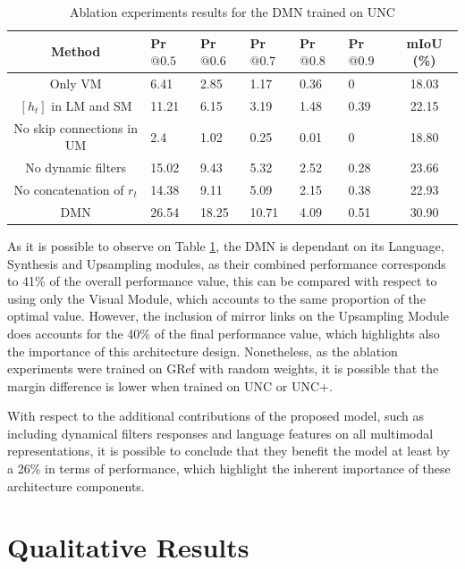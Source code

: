 \begin{table}[!htbp]
    \centering
    \begin{tabular}{ c | p{1.2cm} p{1.2cm} p{1.2cm} p{1.2cm} p{1.2cm} | c }
\hline
Method 								& Pr$@0.5$		& Pr$@0.6$		& Pr$@0.7$		& Pr$@0.8$		& Pr$@0.9$		& mIoU (\%)			\\
\hline
Only VM 							& 6.41 			& 2.85 			& 1.17 			& 0.36 			& 0 			& 18.03 		\\
$[h_{t}]$ in LM and SM	& 11.21 		& 6.15 			& 3.19			& 1.48 			& 0.39			& 22.15 		\\
No skip connections in UM 			& 2.4 			& 1.02 			& 0.25 			& 0.01 			& 0 			& 18.80 		\\
No dynamic filters					& 15.02 		& 9.43 			& 5.32 			& 2.52 			& 0.28 			& 23.66 		\\
No concatenation of $r_{t}$			& 14.38 		& 9.11 			& 5.09			& 2.15 			& 0.38			& 22.93 		\\
\hline
DMN							& 26.54 		& 18.25 		& 10.71 		& 4.09 			& 0.51 			& 30.90	 		\\
\hline
\end{tabular}
    \caption{Ablation experiments results for the DMN trained on UNC}
    \label{Tab:Ablation}
\end{table}

As it is possible to observe on Table \ref{Tab:Ablation}, the DMN is dependant on its Language, Synthesis and Upsampling modules, as their combined performance corresponds to 41\% of the overall performance value, this can be compared with respect to using only the Visual Module, which accounts to the same proportion of the optimal value. However, the inclusion of mirror links on the Upsampling Module does accounts for the 40\% of the final performance value, which highlights also the importance of this architecture design. Nonetheless, as the ablation experiments were trained on GRef with random weights, it is possible that the margin difference is lower when trained on UNC or UNC+.

With respect to the additional contributions of the proposed model, such as including dynamical filters responses and language features on all multimodal representations, it is possible to conclude that they benefit the model at least by a 26\% in terms of performance, which highlight the inherent importance of these architecture components. 

\section{Qualitative Results}

